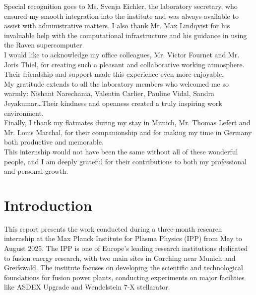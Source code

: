 \documentclass[a4paper,12pt,twoside]{report}
\begin{document}
Special recognition goes to Ms. Svenja Eichler, the laboratory secretary, who ensured my smooth integration into the institute and was always available to assist with administrative matters. I also thank Mr. Max Lindqvist for his invaluable help with the computational infrastructure and his guidance in using the Raven supercomputer.\\

I would like to acknowledge my office colleagues, Mr. Victor Fournet and Mr. Joris Thiel, for creating such a pleasant and collaborative working atmosphere. Their friendship and support made this experience even more enjoyable.\\

My gratitude extends to all the laboratory members who welcomed me so warmly: Nishant Narechania, Valentin Carlier, Pauline Vidal, Sandra Jeyakumar\dots Their kindness and openness created a truly inspiring work environment.\\

Finally, I thank my flatmates during my stay in Munich, Mr. Thomas Lefert and Mr. Louis Marchal, for their companionship and for making my time in Germany both productive and memorable.\\

This internship would not have been the same without all of these wonderful people, and I am deeply grateful for their contributions to both my professional and personal growth.\\


\newpage
\tableofcontents
\thispagestyle{test}

\newpage
\listoffigures
{}


\newpage
\chapter{Introduction}

This report presents the work conducted during a three-month research internship at the Max Planck Institute for Plasma Physics (IPP) from May to August 2025. The IPP is one of Europe's leading research institutions dedicated to fusion energy research, with two main sites in Garching near Munich and Greifswald. The institute focuses on developing the scientific and technological foundations for fusion power plants, conducting experiments on major facilities like ASDEX Upgrade and Wendelstein 7-X stellarator. \\
\end{document}
